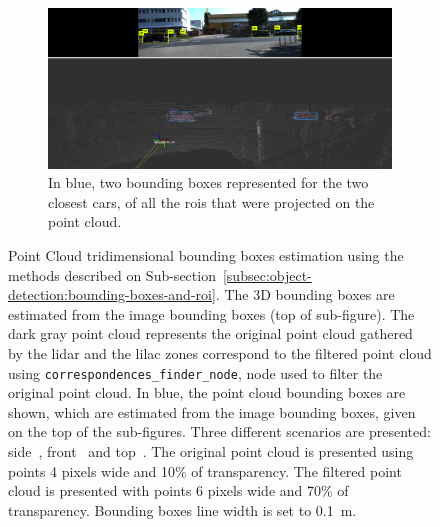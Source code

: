 \begin{figure}[!ht]
	\centering
	\begin{subfigure}[c]{0.8\textwidth}
		\includegraphics[width=\textwidth]{img/image-object-to-point-cloud/bboxes-side-view.png}
		\caption{In blue, two bounding boxes represented for the two closest cars, of all the \acp{roi} that were projected on the point cloud.}
		\label{fig:bboxes-3d-kitti-side}
	\end{subfigure}
	\caption{Point Cloud tridimensional bounding boxes estimation using the methods described on Sub-section~\ref{subsec:object-detection:bounding-boxes-and-roi}. The 3D bounding boxes are estimated from the image bounding boxes (top of sub-figure). The dark gray point cloud represents the original point cloud gathered by the \ac{lidar} and the lilac zones correspond to the filtered point cloud using \texttt{correspondences\_finder\_node}, node used to filter the original point cloud. In blue, the point cloud bounding boxes are shown, which are estimated from the image bounding boxes, given on the top of the sub-figures. Three different scenarios are presented: side~, front~ and top~. The original point cloud is presented using points 4 pixels wide and 10\% of transparency. The filtered point cloud is presented with points 6 pixels wide and 70\% of transparency. Bounding boxes line width is set to \SI{0.1}{\meter}.} 
	\label{fig:bboxes-3d-kitti}
\end{figure}
